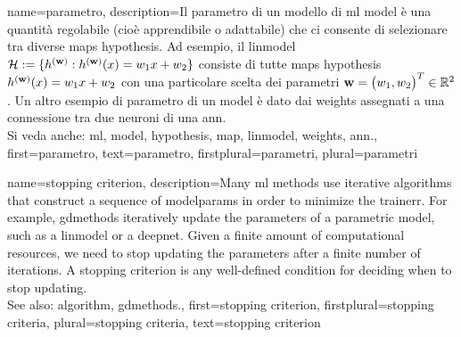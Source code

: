 {name={parametro},
	description={Il parametro di un modello di \gls{ml} \gls{model} è una quantità regolabile (cioè apprendibile o 
	adattabile) che ci consente di selezionare tra diverse \glspl{map} \gls{hypothesis}. Ad esempio, il \gls{linmodel} $\mathcal{H} := \{h^{({\bf w})}: h^{({\bf w})}(x)= w_{1} x + w_{2}\}$ 
		consiste di tutte \glspl{map} \gls{hypothesis} $h^{({\bf w})}(x)= w_{1} x + w_{2}$ 
		con una particolare scelta dei parametri ${\bf w} = \big(w_{1},w_{2}\big)^{T} \in \mathbb{R}^{2}$. 
		Un altro esempio di parametro di un \gls{model} è dato dai \gls{weights} assegnati a una connessione tra due neuroni di una \gls{ann}.
				\\
		Si veda anche: \gls{ml}, \gls{model}, \gls{hypothesis}, \gls{map}, \gls{linmodel}, \gls{weights}, \gls{ann}.},
		first={parametro},
		text={parametro},
		firstplural={parametri}, 
 		plural={parametri}
}

    
{name={stopping criterion},
	description={Many \gls{ml} methods use iterative \glspl{algorithm} 
		that construct a sequence of \gls{modelparams} in order to minimize the \gls{trainerr}. 
		For example, \gls{gdmethods} iteratively update the \glspl{parameter} of a parametric \gls{model}, 
		such as a \gls{linmodel} or a \gls{deepnet}. Given a finite amount of computational 
		resources, we need to stop updating the \glspl{parameter} after a finite number of iterations. 
		A stopping criterion is any well-defined condition for deciding when to stop  
		updating.
				\\
		See also: \gls{algorithm}, \gls{gdmethods}.},
		first={stopping criterion},
		firstplural={stopping criteria},
		plural={stopping criteria}, 
		text={stopping criterion}
}

	
